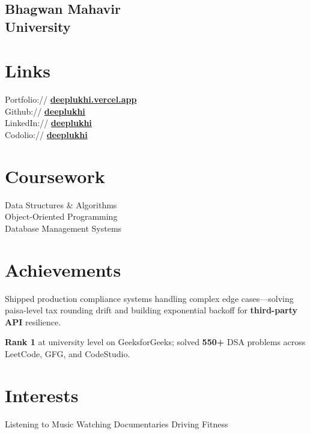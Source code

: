 \documentclass[]{deedy-resume-openfont}
\renewcommand{\sectionsep}{\vspace{8pt}}
\begin{document}
\begin{minipage}[t]{0.33\textwidth}
\subsection{Bhagwan Mahavir\\University}
\sectionsep


\section{Links}
Portfolio:// \href{https://deeplukhi.vercel.app/}{\bf deeplukhi.vercel.app} \\
Github:// \href{https://github.com/deeplukhi}{\bf deeplukhi} \\
LinkedIn:// \href{https://www.linkedin.com/in/deeplukhi/}{\bf deeplukhi} \\
Codolio:// \href{https://codolio.com/profile/deeplukhi}{\bf deeplukhi}
\sectionsep



\section{Coursework}
Data Structures \& Algorithms \\
Object-Oriented Programming \\
Database Management Systems \\
\sectionsep


\section{Achievements}

\textbullet{} Shipped production compliance systems handling complex edge cases—solving paisa-level tax rounding drift and building exponential backoff for \textbf{third-party API} resilience.

\textbullet{} \textbf{Rank 1} at university level on GeeksforGeeks; solved \textbf{550+} DSA problems across LeetCode, GFG, and CodeStudio.

\sectionsep


\section{Interests}
Listening to Music \textbullet{} Watching Documentaries \textbullet{} Driving \textbullet{} Fitness
\sectionsep

%
%

\end{minipage}
\end{document}
